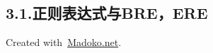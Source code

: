 \documentclass{article}
\begin{document}
\subsection{3.1.\hspace*{0.5em}正则表达式与BRE，ERE}\label{sec-breere}%

\begin{mdbmargintb}{4em}{}%
\begin{mdflushright}%
{\tiny{}Created with~\href{https://www.madoko.net}{Madoko.net}.}%
\end{mdflushright}%
\end{mdbmargintb}%
\end{document}
